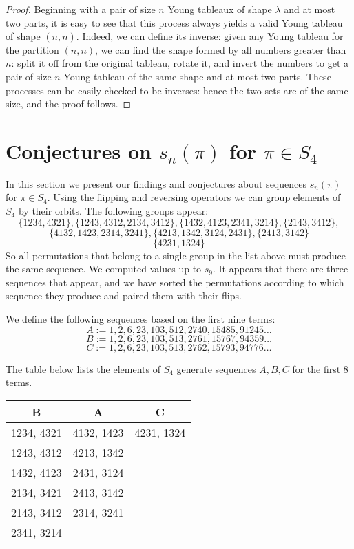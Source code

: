 \documentclass[11pt,letterpaper,twoside,english]{article}
\theoremstyle{theorem}
\theoremstyle{remark}
\begin{document}
\begin{proof}
Beginning with a pair of size $n$ Young tableaux of shape $\lambda$ and at most two parts, it is easy to see that this process always yields a valid Young tableau of shape $(n, n)$. Indeed, we can define its inverse: given any Young tableau for the partition $(n, n)$, we can find the shape formed by all numbers greater than $n$: split it off from the original tableau, rotate it, and invert the numbers to get a pair of size $n$ Young tableau of the same shape and at most two parts. These processes can be easily checked to be inverses: hence the two sets are of the same size, and the proof follows.
\end{proof}

\section{Conjectures on $s_n(\pi)$ for $\pi\in S_4$}
\label{S4}


In this section we present our findings and conjectures about sequences $s_n(\pi)$ for $\pi\in S_4$. Using the flipping and reversing operators we can group elements of $S_4$ by their orbits. The following groups appear: 
$$
\{1234,4321\},
\{1243,4312,2134,3412\},
\{1432,4123,2341,3214\},
\{2143,3412\},
$$
$$
\{4132,1423,2314,3241\},
\{4213,1342,3124,2431\},
\{2413,3142\}
$$
$$
\{4231,1324\}
$$
So all permutations that belong to a single group in the list above must produce the same sequence. 
We computed values up to $s_{9}$. It appears that there are three sequences that appear, and we have sorted the permutations according to which sequence they produce and paired them with their flips.  



We define the following sequences based on the first nine terms:
$$
A:=1,2,6,23,103,512,2740,15485,91245\ldots
$$
$$
B:=1,2,6,23,103,513,2761,15767,94359\ldots
$$
$$
C:=1,2,6,23,103,513,2762,15793,94776\ldots
$$

The table below lists the elements of $S_4$ generate sequences $A,B,C$ for the first 8 terms.

\begin{center}
\begin{tabular}{|c|c|c|}
B &A&C\\
\hline
1234, 4321&4132, 1423&4231, 1324\\
1243, 4312&4213, 1342&\\
1432, 4123&2431, 3124&\\
2134, 3421&2413, 3142&\\
2143, 3412&2314, 3241&\\
2341, 3214&&\\
\end{tabular}
\end{center}
\end{document}

